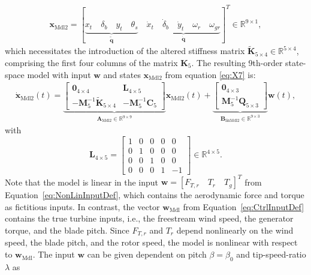     \begin{align}\label{eq:X7}
        \bm{x}_{\text{Mdl2}} = [\underbrace{x_t \quad \delta_b \quad y_t \quad \theta_s}_{\tilde{\bm{q}}}   \quad \underbrace{\dot{x}_t \quad \dot{\delta}_b \quad \dot{y}_t  \quad {\omega}_r \quad {\omega}_{gr}}_{\dot{\bm{q}}}  ]^T \in \mathbb{R}^{9 \times 1},
    \end{align} 
    which necessitates the introduction of the altered stiffness matrix \(\tilde{\mathbf{K}}_{5 \times 4} \in \mathbb{R}^{5 \times 4}\), comprising the first four columns of the matrix \(\mathbf{K}_{5}\). The resulting 9th-order state-space model with input \(\bm{w}\) and states \(\bm{x}_{\text{Mdl2}}\) from equation \eqref{eq:X7} is:
    \begin{align}\label{eq:7state}
        \dot{\bm{x}}_{\text{Mdl2}}(t) = \underbrace{\begin{bmatrix}
                \bm{0}_{4 \times 4} & \mathbf{L}_{4 \times 5}  \\
                -\mathbf{M}_5^{-1}\tilde{\mathbf{K}}_{5 \times 4} & -\mathbf{M}_5^{-1}\mathbf{C}_5
        \end{bmatrix}}_{\bm{A}_{\text{Mdl2}}  \in \mathbb{R}^{9 \times 9}} \bm{x}_{\text{Mdl2}}(t) + \underbrace{\begin{bmatrix}
                \bm{0}_{4 \times 3} \\
                \mathbf{M}_5^{-1}\mathbf{Q}_{5 \times 3}
        \end{bmatrix}}_{\bm{B}_{\text{linMdl2}}  \in \mathbb{R}^{9 \times 3}} \bm{w}(t),  
    \end{align}
    with 
    \[
    \mathbf{L}_{4 \times5} = \begin{bmatrix}
        1 & 0 & 0 & 0 & 0 \\
        0 & 1 & 0 & 0 & 0 \\
        0 & 0 & 1 & 0 & 0 \\
        0 & 0 & 0 & 1 & -1
    \end{bmatrix} \in \mathbb{R}^{4 \times 5}.
    \]
    Note that the model is linear in the input $\bm{w} = [F_{T,r} \quad T_r \quad T_g]^T$ from Equation~\eqref{eq:NonLinInputDef}, which contains the aerodynamic force and torque as fictitious inputs. In contrast, the vector $\bm{w}_{\text{Mdl}}$ from Equation~\eqref{eq:CtrlInputDef} contains the true turbine inputs, i.e., the freestream wind speed, the generator torque, and the blade pitch. Since $F_{T,r}$ and $T_r$ depend nonlinearly on the wind speed, the blade pitch, and the rotor speed, the model is nonlinear with respect to $\bm{w}_{\text{Mdl}}$. The input $\bm{w}$ can be given dependent on pitch $\beta = \beta_0$ and tip-speed-ratio $\lambda$ as
